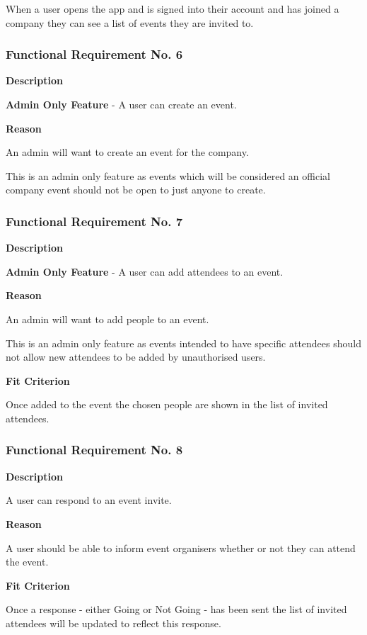 When a user opens the app and is signed into their account and has joined a company they can see a list of events they are invited to.

\subsubsection{Functional Requirement No. 6}

\textbf{Description}

\textbf{Admin Only Feature} - A user can create an event.

\textbf{Reason}

An admin will want to create an event for the company. 

This is an admin only feature as events which will be considered an official company event should not be open to just anyone to create.

\subsubsection{Functional Requirement No. 7}

\textbf{Description}

\textbf{Admin Only Feature} - A user can add attendees to an event.

\textbf{Reason}

An admin will want to add people to an event.

This is an admin only feature as events intended to have specific attendees should not allow new attendees to be added by unauthorised users.

\textbf{Fit Criterion}

Once added to the event the chosen people are shown in the list of invited attendees.

\subsubsection{Functional Requirement No. 8}

\textbf{Description}

A user can respond to an event invite.

\textbf{Reason}

A user should be able to inform event organisers whether or not they can attend the event.

\textbf{Fit Criterion}

Once a response - either Going or Not Going - has been sent the list of invited attendees will be updated to reflect this response.

